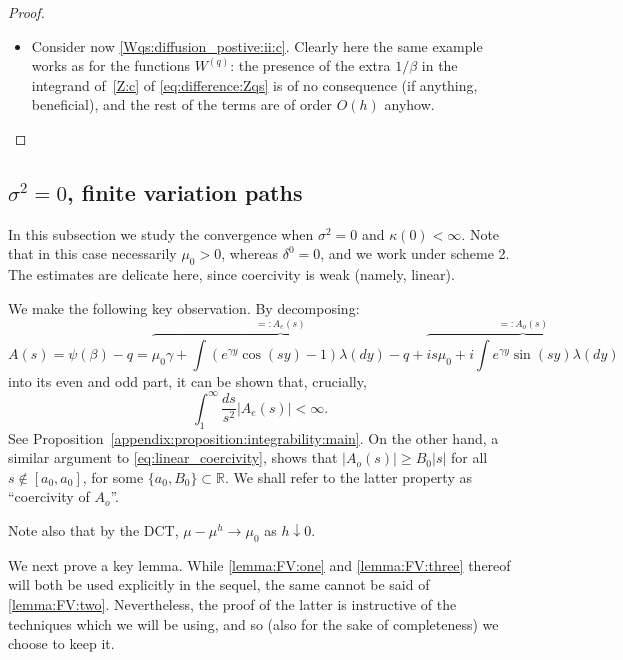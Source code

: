 \documentclass[pdftex,oneside,11pt,reqno]{amsart}
\theoremstyle{definition}
\theoremstyle{theorem}
\theoremstyle{remark}
\numberwithin{equation}{section}
\numberwithin{definition}{section}
\begin{document}
\begin{proof}
\begin{itemize}
\item Consider now \ref{Wqs:diffusion_postive:ii:c}. Clearly here the same example works as for the functions ${W^{(q)}}$: the presence of the extra $1/\beta$ in the integrand of~\ref{Z:c} of \eqref{eq:difference:Zqs} is of no consequence (if anything, beneficial), and the rest of the terms are of order $O(h)$ anyhow.
\end{itemize}
\end{proof}

\subsection{${\sigma^2}=0$, finite variation paths}\label{subsection:scales:FV}
In this subsection we study the convergence when ${\sigma^2}=0$ and $\kappa(0)<\infty$. Note that in this case necessarily $\mu_0>0$, whereas $\delta^0=0$, and we work under scheme 2. The estimates are delicate here, since coercivity is weak (namely, linear). 

We make the following key observation. By decomposing: 
\begin{equation}\label{eq:FVpaths_decomposition}
A(s)=\psi(\beta)-q=\overbrace{\mu_0\gamma+\int(e^{\gamma y}\cos(sy)-1){\lambda}(dy)-q}^{=:A_e(s)}+\overbrace{is\mu_0+i\int e^{\gamma y}\sin(sy){\lambda}(dy)}^{=:A_o(s)}
\end{equation} into its even and odd part, it can be shown that, crucially, 
\begin{equation}\label{eq:scales:crucial}
\int_1^\infty \frac{ds}{s^2}\vert A_e(s)\vert<\infty.
\end{equation} 
See Proposition~\ref{appendix:proposition:integrability:main}. On the other hand, a similar argument to \eqref{eq:linear_coercivity}, shows that $\vert A_o(s)\vert\geq B_0 \vert s\vert$ for all $s\notin [a_0,a_0]$, for some $\{a_0,B_0\}\subset \mathbb{R}$. We shall refer to the latter property as ``coercivity of $A_o$''. 

Note also that by the DCT, $\mu-\mu^h\to \mu_0$ as $h\downarrow 0$. 

We next prove a key  lemma. While \eqref{lemma:FV:one} and \eqref{lemma:FV:three} thereof will both be used explicitly in the sequel, the same cannot be said of \eqref{lemma:FV:two}. Nevertheless, 
the proof of the latter is instructive of the techniques which we will be using, and so (also for the sake of 
completeness) we choose to keep it. 
\end{document}
